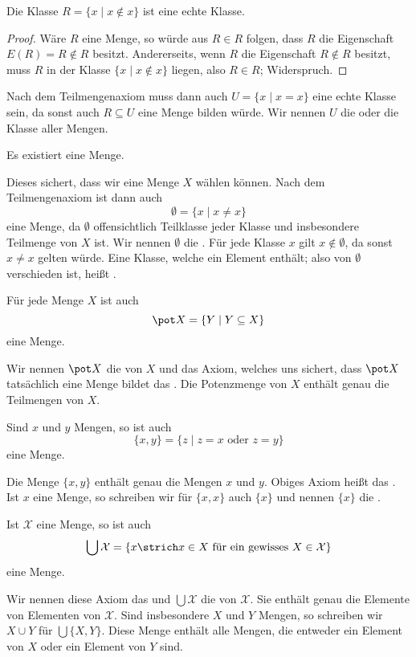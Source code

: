 \begin{lemma}
Die Klasse $R=\{x\mid x\notin x\}$ ist eine echte Klasse.
\end{lemma}
\begin{proof}
Wäre $R$ eine Menge, so würde aus $R\in R$ folgen, dass $R$ die Eigenschaft $E(R)=R\notin R$ besitzt. Andererseits, wenn $R$ die Eigenschaft $R\notin R$ besitzt, muss $R$ in der Klasse $\{x\mid x\notin x\}$ liegen, also $R\in R$; Widerspruch.
\end{proof}

Nach dem Teilmengenaxiom muss dann auch $U=\{x\mid x=x\}$ eine echte Klasse sein, da sonst auch $R\subseteq U$ eine Menge bilden würde. Wir nennen $U$ die  oder die Klasse aller Mengen.

\begin{axiom}
Es existiert eine Menge.
\end{axiom}

Dieses  sichert, dass wir eine Menge $X$ wählen können. Nach dem Teilmengenaxiom ist dann auch
\[\emptyset=\{x\mid x\not= x\}\] eine Menge, da $\emptyset$ offensichtlich Teilklasse jeder Klasse und insbesondere Teilmenge von $X$ ist. Wir nennen $\emptyset$ die . Für jede Klasse $x$ gilt $x\notin\emptyset$, da sonst $x\not= x$ gelten würde. Eine Klasse, welche ein Element enthält; also von $\emptyset$ verschieden ist, heißt .

\begin{axiom}
Für jede Menge $X$ ist auch
\[
\pot X=\{Y\mid Y\subseteq X\}
\]
eine Menge.
\end{axiom}
Wir nennen $\pot X$ die  von $X$ und das Axiom, welches uns sichert, dass $\pot X$ tatsächlich eine Menge bildet das . Die Potenzmenge von $X$ enthält genau die Teilmengen von $X$.

\begin{axiom}
Sind $x$ und $y$ Mengen, so ist auch
\[
\{x,y\}=\{z\mid z=x\text{ oder }z=y\}\]
eine Menge.
\end{axiom}
Die Menge $\{x,y\}$ enthält genau die Mengen $x$ und $y$. Obiges Axiom heißt das . Ist $x$ eine Menge, so schreiben wir für $\{x,x\}$ auch $\{x\}$ und nennen $\{x\}$ die .

\begin{axiom}
Ist $\mathcal{X}$ eine Menge, so ist auch
\[
\bigcup\mathcal{X}=\left\{x\strich x\in X\text{ für ein gewisses }X\in\mathcal{X}\right\}
\]
eine Menge.
\end{axiom}
Wir nennen diese Axiom das  und $\bigcup\mathcal{X}$ die  von $\mathcal{X}$. Sie enthält genau die Elemente von Elementen von $\mathcal{X}$. Sind insbesondere $X$ und $Y$ Mengen, so schreiben wir $X\cup Y$ für $\bigcup\{X,Y\}$. Diese Menge enthält alle Mengen, die entweder ein Element von $X$ oder ein Element von $Y$ sind.

